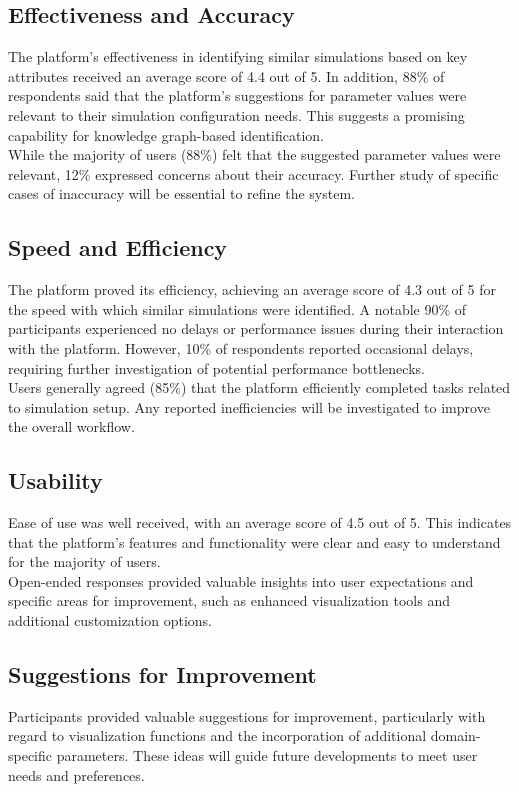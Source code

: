 \subsection{Effectiveness and Accuracy}
The platform's effectiveness in identifying similar simulations based on key attributes received an average score of 4.4 out of 5. In addition, 88\% of respondents said that the platform's suggestions for parameter values were relevant to their simulation configuration needs. This suggests a promising capability for knowledge graph-based identification.\\
While the majority of users (88\%) felt that the suggested parameter values were relevant, 12\% expressed concerns about their accuracy. Further study of specific cases of inaccuracy will be essential to refine the system.\\


\subsection{Speed and Efficiency}
The platform proved its efficiency, achieving an average score of 4.3 out of 5 for the speed with which similar simulations were identified. A notable 90\% of participants experienced no delays or performance issues during their interaction with the platform. However, 10\% of respondents reported occasional delays, requiring further investigation of potential performance bottlenecks.\\
Users generally agreed (85\%) that the platform efficiently completed tasks related to simulation setup. Any reported inefficiencies will be investigated to improve the overall workflow.\\


\subsection{Usability}
Ease of use was well received, with an average score of 4.5 out of 5. This indicates that the platform's features and functionality were clear and easy to understand for the majority of users.\\
Open-ended responses provided valuable insights into user expectations and specific areas for improvement, such as enhanced visualization tools and additional customization options.\\


\subsection{Suggestions for Improvement}
Participants provided valuable suggestions for improvement, particularly with regard to visualization functions and the incorporation of additional domain-specific parameters. These ideas will guide future developments to meet user needs and preferences.\\


